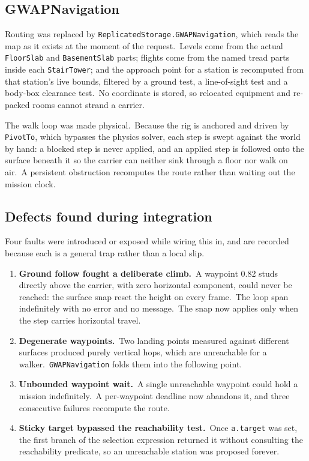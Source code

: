 \subsection{GWAPNavigation}
Routing was replaced by \texttt{ReplicatedStorage.GWAPNavigation}, which reads
the map as it exists at the moment of the request.\ Levels come from the actual
\texttt{FloorSlab} and \texttt{BasementSlab} parts; flights come from the named
tread parts inside each \texttt{StairTower}; and the approach point for a
station is recomputed from that station's live bounds, filtered by a ground
test, a line-of-sight test and a body-box clearance test.\ No coordinate is
stored, so relocated equipment and re-packed rooms cannot strand a carrier.\

The walk loop was made physical.\ Because the rig is anchored and driven by
\texttt{PivotTo}, which bypasses the physics solver, each step is swept against
the world by hand: a blocked step is never applied, and an applied step is
followed onto the surface beneath it so the carrier can neither sink through a
floor nor walk on air.\ A persistent obstruction recomputes the route rather
than waiting out the mission clock.\

\subsection{Defects found during integration}
Four faults were introduced or exposed while wiring this in, and are recorded
because each is a general trap rather than a local slip.\

\begin{enumerate}
\item \textbf{Ground follow fought a deliberate climb.}\ A waypoint 0.82 studs
      directly above the carrier, with zero horizontal component, could never be
      reached: the surface snap reset the height on every frame.\ The loop span
      indefinitely with no error and no message.\ The snap now applies only when
      the step carries horizontal travel.\
\item \textbf{Degenerate waypoints.}\ Two landing points measured against
      different surfaces produced purely vertical hops, which are unreachable
      for a walker.\ \texttt{GWAPNavigation} folds them into the following
      point.\
\item \textbf{Unbounded waypoint wait.}\ A single unreachable waypoint could
      hold a mission indefinitely.\ A per-waypoint deadline now abandons it, and
      three consecutive failures recompute the route.\
\item \textbf{Sticky target bypassed the reachability test.}\ Once
      \texttt{a.target} was set, the first branch of the selection expression
      returned it without consulting the reachability predicate, so an
      unreachable station was proposed forever.\
\end{enumerate}

